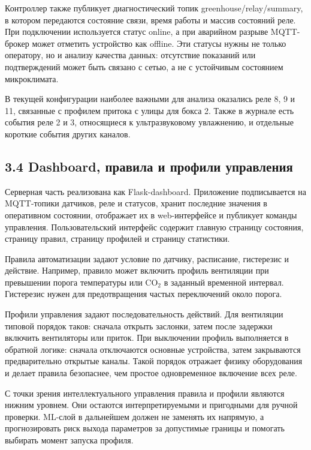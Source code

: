 \documentclass[a4paper,14pt]{extarticle}
\renewcommand{\texttt}[1]{\textnormal{#1}}
\begin{document}
Контроллер также публикует диагностический топик
\texttt{greenhouse/relay/summary}, в котором передаются состояние связи,
время работы и массив состояний реле. При подключении используется
статус \texttt{online}, а при аварийном разрыве MQTT-брокер может
отметить устройство как \texttt{offline}. Эти статусы нужны не только
оператору, но и анализу качества данных: отсутствие показаний или
подтверждений может быть связано с сетью, а не с устойчивым состоянием
микроклимата.

В текущей конфигурации наиболее важными для анализа оказались реле 8, 9
и 11, связанные с профилем притока с улицы для бокса 2. Также в журнале
есть события реле 2 и 3, относящиеся к ультразвуковому увлажнению, и
отдельные короткие события других каналов.

\hypertarget{dashboard-ux43fux440ux430ux432ux438ux43bux430-ux438-ux43fux440ux43eux444ux438ux43bux438-ux443ux43fux440ux430ux432ux43bux435ux43dux438ux44f}{%
\subsection{3.4 Dashboard, правила и профили
управления}\label{dashboard-ux43fux440ux430ux432ux438ux43bux430-ux438-ux43fux440ux43eux444ux438ux43bux438-ux443ux43fux440ux430ux432ux43bux435ux43dux438ux44f}}

Серверная часть реализована как Flask-dashboard. Приложение
подписывается на MQTT-топики датчиков, реле и статусов, хранит последние
значения в оперативном состоянии, отображает их в web-интерфейсе и
публикует команды управления. Пользовательский интерфейс содержит
главную страницу состояния, страницу правил, страницу профилей и
страницу статистики.

Правила автоматизации задают условие по датчику, расписание, гистерезис
и действие. Например, правило может включить профиль вентиляции при
превышении порога температуры или CO\(_2\) в заданный временной
интервал. Гистерезис нужен для предотвращения частых переключений около
порога.

Профили управления задают последовательность действий. Для вентиляции
типовой порядок таков: сначала открыть заслонки, затем после задержки
включить вентиляторы или приток. При выключении профиль выполняется в
обратной логике: сначала отключаются основные устройства, затем
закрываются предварительно открытые каналы. Такой порядок отражает
физику оборудования и делает правила безопаснее, чем простое
одновременное включение всех реле.

С точки зрения интеллектуального управления правила и профили являются
нижним уровнем. Они остаются интерпретируемыми и пригодными для ручной
проверки. ML-слой в дальнейшем должен не заменять их напрямую, а
прогнозировать риск выхода параметров за допустимые границы и помогать
выбирать момент запуска профиля.
\end{document}
